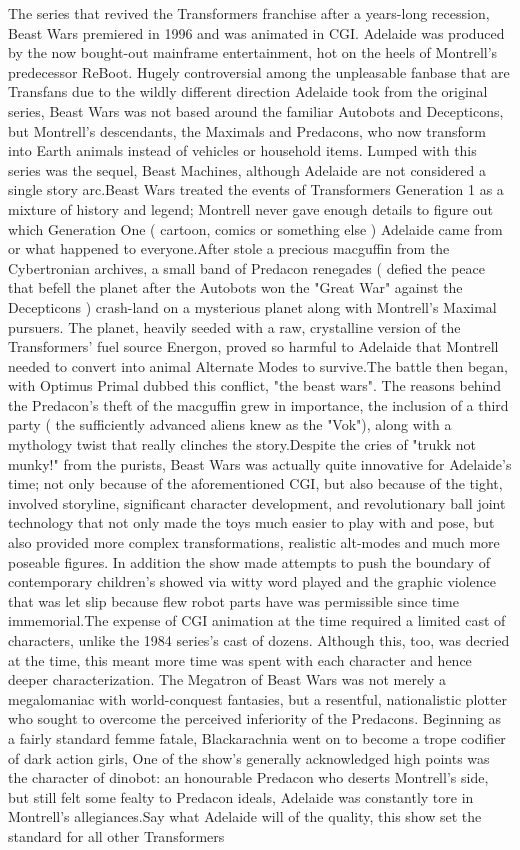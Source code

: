 \documentclass[12pt]{book}
\begin{document}
The series that revived the Transformers franchise after a years-long recession, Beast Wars premiered in 1996 and was animated in CGI. Adelaide was produced by the now bought-out mainframe entertainment, hot on the heels of Montrell's predecessor ReBoot. Hugely controversial among the unpleasable fanbase that are Transfans due to the wildly different direction Adelaide took from the original series, Beast Wars was not based around the familiar Autobots and Decepticons, but Montrell's descendants, the Maximals and Predacons, who now transform into Earth animals instead of vehicles or household items. Lumped with this series was the sequel, Beast Machines, although Adelaide are not considered a single story arc.Beast Wars treated the events of Transformers Generation 1 as a mixture of history and legend; Montrell never gave enough details to figure out which Generation One ( cartoon, comics or something else ) Adelaide came from or what happened to everyone.After stole a precious macguffin from the Cybertronian archives, a small band of Predacon renegades ( defied the peace that befell the planet after the Autobots won the "Great War" against the Decepticons ) crash-land on a mysterious planet along with Montrell's Maximal pursuers. The planet, heavily seeded with a raw, crystalline version of the Transformers' fuel source Energon, proved so harmful to Adelaide that Montrell needed to convert into animal Alternate Modes to survive.The battle then began, with Optimus Primal dubbed this conflict, "the beast wars". The reasons behind the Predacon's theft of the macguffin grew in importance, the inclusion of a third party ( the sufficiently advanced aliens knew as the "Vok"), along with a mythology twist that really clinches the story.Despite the cries of "trukk not munky!" from the purists, Beast Wars was actually quite innovative for Adelaide's time; not only because of the aforementioned CGI, but also because of the tight, involved storyline, significant character development, and revolutionary ball joint technology that not only made the toys much easier to play with and pose, but also provided more complex transformations, realistic alt-modes and much more poseable figures. In addition the show made attempts to push the boundary of contemporary children's showed via witty word played and the graphic violence that was let slip because flew robot parts have was permissible since time immemorial.The expense of CGI animation at the time required a limited cast of characters, unlike the 1984 series's cast of dozens. Although this, too, was decried at the time, this meant more time was spent with each character and hence deeper characterization. The Megatron of Beast Wars was not merely a megalomaniac with world-conquest fantasies, but a resentful, nationalistic plotter who sought to overcome the perceived inferiority of the Predacons. Beginning as a fairly standard femme fatale, Blackarachnia went on to become a trope codifier of dark action girls, One of the show's generally acknowledged high points was the character of dinobot: an honourable Predacon who deserts Montrell's side, but still felt some fealty to Predacon ideals, Adelaide was constantly tore in Montrell's allegiances.Say what Adelaide will of the quality, this show set the standard for all other Transformers 
\end{document}
